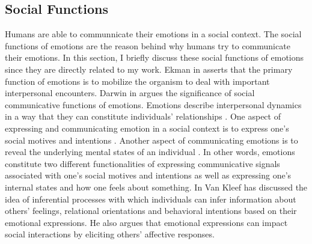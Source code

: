 \documentclass[11pt]{article}
\begin{document}
\subsection{Social Functions}

Humans are able to communnicate their emotions in a social context. The social
functions of emotions are the reason behind why humans try to communicate their
emotions. In this section, I briefly discuss these social functions of emotions
since they are directly related to my work. Ekman in
\cite{ekman:argument-emotions} asserts that the primary function of emotions is
to mobilize the organism to deal with important interpersonal encounters. Darwin
in \cite{darwin:emotion-expression} argues the significance of social
communicative functions of emotions. Emotions describe interpersonal dynamics in
a way that they can constitute individuals' relationships
\cite{parkinson:emotions-social, tiedens:social-life}. One aspect of expressing
and communicating emotion in a social context is to express one's social motives
and intentions \cite{hess:darwin-emotion}. Another aspect of communicating
emotions is to reveal the underlying mental states of an individual
\cite{parkinson:emotion-communication}. In other words, emotions constitute two
different functionalities of expressing communicative signals associated with
one's social motives and intentions as well as expressing one's internal states
and how one feels about something. In \cite{kleef:emotion-regulate-social} Van
Kleef has discussed the idea of inferential processes with which individuals can
infer information about others' feelings, relational orientations and behavioral
intentions based on their emotional expressions. He also argues that emotional
expressions can impact social interactions by eliciting others' affective
responses.
\end{document}

